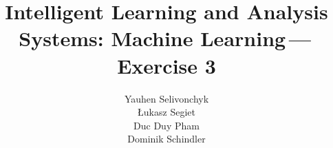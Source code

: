 \documentclass[a4paper]{article}
\newcommand{\exnumber}{3}
\begin{document}
\title{Intelligent Learning and Analysis Systems: Machine Learning\,---\,Exercise \exnumber}
\author{Yauhen Selivonchyk\\ {\L}ukasz Segiet\\Duc Duy Pham\\Dominik Schindler}

\maketitle






\end{document}
